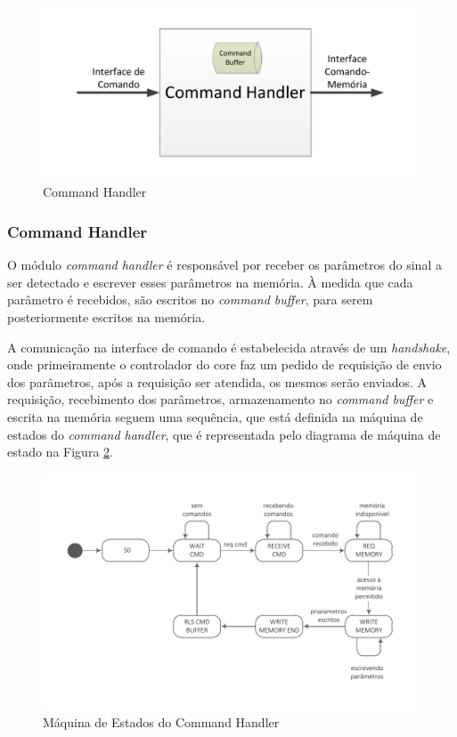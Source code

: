 \documentclass[monografia]{subfiles}
\begin{document}
			\begin{figure}[!h]
			\centering 
			\includegraphics[scale=0.63]{img/modulos/mod_commandHandler.pdf}
			\caption{Command Handler}
			\label{fig:commandHandlerBlock}
			\end{figure}


		\subsubsection*{Command Handler}		
		\label{sec:commandHandlerSection}
			O módulo \textit{command handler} é responsável por receber os parâmetros do sinal a ser detectado e escrever esses parâmetros na memória. 
			À medida que cada parâmetro é recebidos, são escritos no \textit{command buffer}, para serem posteriormente escritos na memória.

			A comunicação na interface de comando é estabelecida através de um \textit{handshake}, onde primeiramente o controlador do core faz
			um pedido de requisição de envio dos parâmetros, após a requisição ser atendida, os mesmos serão enviados. A requisição, recebimento dos 
			parâmetros, armazenamento no \textit{command buffer} e escrita na memória seguem uma sequência, que está definida na máquina de estados
			do \textit{command handler}, que é representada pelo diagrama de máquina de estado na Figura \ref{fig:commandHandlerStatemachine}.

				\begin{figure}[!h]
				\centering
 				\includegraphics[scale=1.12]{img/stateMachines/commandHanlder.pdf}
				\caption{Máquina de Estados do Command Handler}
				\label{fig:commandHandlerStatemachine}
				\end{figure}
\end{document}
